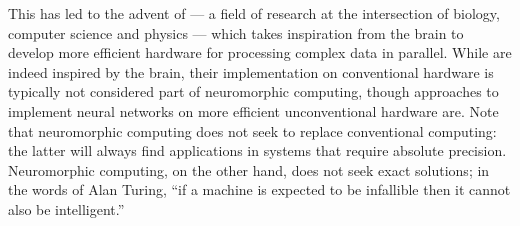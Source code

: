 This has led to the advent of  --- a field of research at the intersection of biology, computer science and physics --- which takes inspiration from the brain to develop more efficient hardware for processing complex data in parallel.
While  are indeed inspired by the brain, their implementation on conventional hardware is typically not considered part of neuromorphic computing, though approaches to implement neural networks on more efficient unconventional hardware are. %
Note that neuromorphic computing does not seek to replace conventional computing: the latter will always find applications in systems that require absolute precision. %
Neuromorphic computing, on the other hand, does not seek exact solutions; in the words of Alan Turing, ``if a machine is expected to be infallible then it cannot also be intelligent.''

\vspace{-1.5em}
\vspace{-1em}

